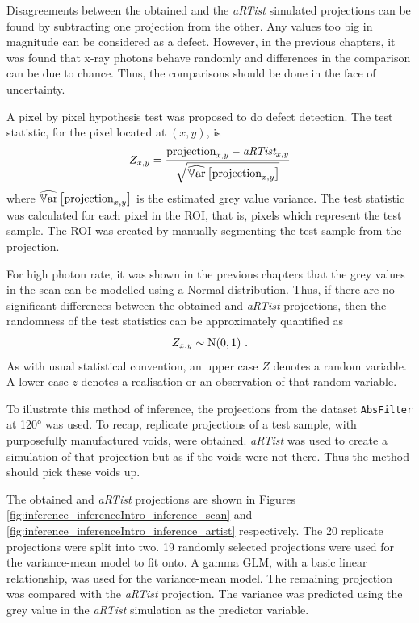 Disagreements between the obtained and the \emph{aRTist} simulated projections can be found by subtracting one projection from the other. Any values too big in magnitude can be considered as a defect. However, in the previous chapters, it was found that x-ray photons behave randomly and differences in the comparison can be due to chance. Thus, the comparisons should be done in the face of uncertainty.

A pixel by pixel hypothesis test was proposed to do defect detection. The test statistic, for the pixel located at $(x,y)$, is
\begin{equation}
  Z_{x,y} = 
  \dfrac{
    \text{projection}_{x,y} - \emph{aRTist}_{x,y}
  }
  {
    \sqrt{\widehat{\operatorname{\mathbb{V}ar}}\left[\text{projection}_{x,y}\right]}
  }
\end{equation}
where $\widehat{\operatorname{\mathbb{V}ar}}\left[\text{projection}_{x,y}\right]$ is the estimated grey value variance. The test statistic was calculated for each pixel in the ROI, that is, pixels which represent the test sample. The ROI was created by manually segmenting the test sample from the projection.

For high photon rate, it was shown in the previous chapters that the grey values in the scan can be modelled using a Normal distribution. Thus, if there are no significant differences between the obtained and \emph{aRTist} projections, then the randomness of the test statistics can be approximately quantified as
\begin{equation}
Z_{x,y}\sim \operatorname{N}(0,1) \ .
\end{equation}
As with usual statistical convention, an upper case $Z$ denotes a random variable. A lower case $z$ denotes a realisation or an observation of that random variable.

To illustrate this method of inference, the projections from the dataset \texttt{AbsFilter} at \ang{120} was used. To recap, replicate projections of a test sample, with purposefully manufactured voids, were obtained. \emph{aRTist} was used to create a simulation of that projection but as if the voids were not there. Thus the method should pick these voids up.

The obtained and \emph{aRTist} projections are shown in Figures \ref{fig:inference_inferenceIntro_inference_scan} and \ref{fig:inference_inferenceIntro_inference_artist} respectively. The 20 replicate projections were split into two. 19 randomly selected projections were used for the variance-mean model to fit onto. A gamma GLM, with a basic linear relationship, was used for the variance-mean model. The remaining projection was compared with the \emph{aRTist} projection. The variance was predicted using the grey value in the \emph{aRTist} simulation as the predictor variable.

